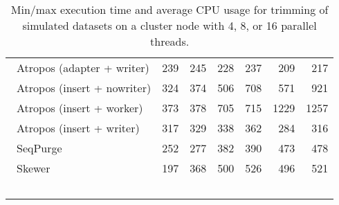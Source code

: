 \begin{table}[ht]
\begin{tabular}{lr|rr|rr|r}
        \\\    
        Atropos (adapter + writer) &
        
        239
        & 245 &
        
        
        228
        & 237 &
        
        
        209
        & 217
        
        \\\    
        Atropos (insert + nowriter) &
        
        324
        & 374 &
        
        
        506
        & 708 &
        
        
        571
        & 921
        
        \\\    
        Atropos (insert + worker) &
        
        373
        & 378 &
        
        
        705
        & 715 &
        
        
        1229
        & 1257
        
        \\\    
        Atropos (insert + writer) &
        
        317
        & 329 &
        
        
        338
        & 362 &
        
        
        284
        & 316
        
        \\\    
        SeqPurge &
        
        252
        & 277 &
        
        
        382
        & 390 &
        
        
        473
        & 478
        
        \\\    
        Skewer &
        
        197
        & 368 &
        
        
        500
        & 526 &
        
        
        496
        & 521
        
        \\\    
\end{tabular}
\caption{Min/max execution time and average CPU usage for trimming of simulated datasets on a cluster node with 4, 8, or 16 parallel threads.\label{tab:simulated-performance-cluster}}
\end{table}
